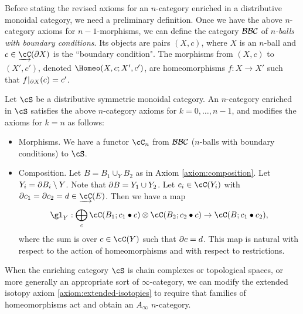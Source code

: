 Before stating the revised axioms for an $n$-category enriched in a distributive monoidal category,
we need a preliminary definition.
Once we have the above $n$-category axioms for $n{-}1$-morphisms, we can define the 
category ${\mathcal{BBC}}$ of {\it $n$-balls with boundary conditions}.
Its objects are pairs $(X, c)$, where $X$ is an $n$-ball and $c \in \cl\cC(\bd X)$ is the ``boundary condition".
The morphisms from $(X, c)$ to $(X', c')$, denoted $\Homeo(X,c; X', c')$, are
homeomorphisms $f:X\to X'$ such that $f|_{\partial X}(c) = c'$.
 
\begin{axiom}
\label{axiom:enriched}
Let $\cS$ be a distributive symmetric monoidal category.
An $n$-category enriched in $\cS$ satisfies the above $n$-category axioms for $k=0,\ldots,n-1$,
and modifies the axioms for $k=n$ as follows:
\begin{itemize}
\item Morphisms. We have a functor $\cC_n$ from ${\mathcal{BBC}}$ ($n$-balls with boundary conditions) to $\cS$.
\item Composition. Let $B = B_1\cup_Y B_2$ as in Axiom \ref{axiom:composition}.
Let $Y_i = \partial B_i \setminus Y$.  
Note that $\partial B = Y_1\cup Y_2$.
Let $c_i \in \cC(Y_i)$ with $\bd c_1 = \bd c_2 = d \in \cl\cC(E)$.
Then we have a map
\[
	\gl_Y : \bigoplus_c \cC(B_1; c_1 \bullet c) \otimes \cC(B_2; c_2\bullet c) \to \cC(B; c_1\bullet c_2),
\]
where the sum is over $c\in\cC(Y)$ such that $\partial c = d$.
This map is natural with respect to the action of homeomorphisms and with respect to restrictions.
\end{itemize}
\end{axiom}

\medskip

When the enriching category $\cS$ is chain complexes or topological spaces,
or more generally an appropriate sort of $\infty$-category,
we can modify the extended isotopy axiom \ref{axiom:extended-isotopies}
to require that families of homeomorphisms act
and obtain an $A_\infty$ $n$-category.


